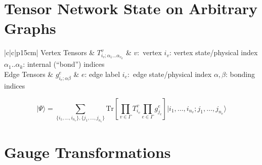 \documentclass[a0,portrait]{a0poster}
\newcommand{\ket}[1]{\vert #1 \rangle}
\newcommand{\Tr}{\mathrm{Tr}}
\begin{document}
\begin{multicols}{2}
\vspace*{2cm}

\color{DarkRed}

\section*{Tensor Network State on Arbitrary Graphs}

\begin{center}
	\begin{tabular}{|c|c|p{15cm}|}
		\toprule
		Vertex Tensors & $ T^v_{i_v; \alpha_1 \ldots \alpha_{v_k}} $ & $ v: $ vertex \newline $i_v$: vertex state/physical index \newline $\alpha_1 .. \alpha_k$: internal (``bond'') indices \\
		\midrule
		Edge Tensors & $ g^e_{i_e; \alpha\beta} $ &  $ e $: edge label \newline $i_e:$ edge state/physical index \newline $\alpha, \beta $: bonding indices \\
		\bottomrule
	\end{tabular}
\end{center}

\begin{minipage}{\linewidth}
	\begin{equation*}
		\boxed{	\ket{\Psi} = \sum_{\{i_1,\ldots,i_{n_v}\}, \{ j_1,\ldots,j_{n_e} \} } \Tr\left[ \prod_{v \in \Gamma} T^v_{i_v} \prod_{e \in \Gamma} g^e_{j_e} \right] \ket{i_1,\ldots,i_{n_v}; j_1, \ldots, j_{n_e} }}
	\end{equation*}
\end{minipage}


\color{Black}


\section*{Gauge Transformations}


\end{multicols}
\end{document}
